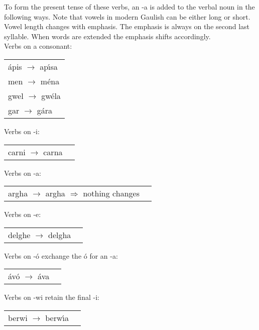 \noindent To form the present tense of these verbs, an -a is added to the verbal noun in the following ways. Note that vowels in modern Gaulish can be either long or short. Vowel length changes with emphasis. The emphasis is always on the second last syllable. When words are extended the emphasis shifts accordingly.\\

\noindent Verbs on a consonant:
\begin{table}[H]
\begin{tabu}{l}
  \'{a}pis $\rightarrow$ ap\'{\i}sa\\
  men $\rightarrow$ m\'{e}na\\
  gwel $\rightarrow$ gw\'{e}la\\
  gar $\rightarrow$ g\'{a}ra\\
\end{tabu}
\label{examples_verbs_oac}
\end{table}

\noindent Verbs on -i:
\begin{table}[H]
\begin{tabu}{ll}
  carni $\rightarrow$ carna
\end{tabu}
\label{examples_verbs_on_i}
\end{table}

\noindent Verbs on -a:
\begin{table}[H]
\begin{tabu}{ll}
  argha $\rightarrow$ argha $\Rightarrow$ nothing changes
\end{tabu}
\label{examples_verbs_on_a}
\end{table}

\noindent Verbs on -e:
\begin{table}[H]
\begin{tabu}{ll}
  delghe $\rightarrow$ delgha
\end{tabu}
\label{examples_verbs_on_e}
\end{table}

\noindent Verbs on -\'{o} exchange the \'{o} for an -a:
\begin{table}[H]
\begin{tabu}{ll}
  \'{a}v\'{o} $\rightarrow$ \'{a}va
\end{tabu}
\label{examples_verbs_on_oo}
\end{table}

\noindent Verbs on -wi retain the final -i:
\begin{table}[H]
\begin{tabu}{ll}
  berwi $\rightarrow$ berw\'{\i}a
\end{tabu}
\label{examples_verbs_on_wi}
\end{table}

